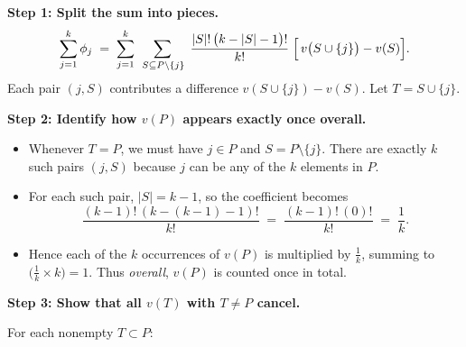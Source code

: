 \documentclass{article}
\begin{document}
\begin{proofsketch}
\noindent \textbf{Step 1: Split the sum into pieces.}
\[
\sum_{j=1}^k \phi_j 
\;=\;
\sum_{j=1}^k 
\;\sum_{\,S \subseteq P\setminus\{j\}}
\;\frac{|S|!\,\bigl(k - |S| -1\bigr)!}{k!}
\;\Bigl[\,v\bigl(S \cup \{j\}\bigr) - v(S)\Bigr].
\]
Each pair $(j,S)$ contributes a difference $v(S \cup \{j\}) - v(S)$. Let $T = S \cup \{j\}$.

\medskip
\noindent
\textbf{Step 2: Identify how $v(P)$ appears exactly once overall.}

\begin{itemize}
    \item Whenever $T = P$, we must have $j \in P$ and $S = P \setminus \{j\}$. There are exactly $k$ such pairs \((j,S)\) because $j$ can be any of the $k$ elements in $P$.
    \item For each such pair, $\lvert S\rvert = k-1$, so the coefficient becomes
    \[
       \frac{(k-1)!\,(k - (k-1) - 1)!}{k!}
       \;=\;
       \frac{(k-1)!\,(0)!}{k!}
       \;=\;
       \frac{1}{k}.
    \]
    \item Hence each of the $k$ occurrences of $v(P)$ is multiplied by $\tfrac{1}{k}$, summing to $\bigl(\frac{1}{k}\times k\bigr)=1$. Thus \emph{overall}, $v(P)$ is counted once in total. 
\end{itemize}

\medskip
\noindent
\textbf{Step 3: Show that all $v(T)$ with $T \neq P$ cancel.}

For each nonempty $T \subset P$:


\end{proofsketch}
\end{document}
